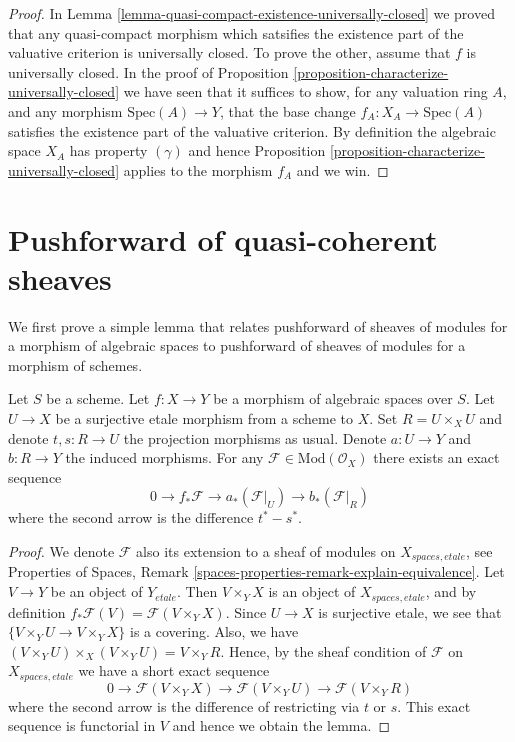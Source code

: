 \begin{proof}
In Lemma \ref{lemma-quasi-compact-existence-universally-closed}
we proved that any quasi-compact morphism which satsifies the existence
part of the valuative criterion is universally closed.
To prove the other, assume that $f$ is universally closed.
In the proof of
Proposition \ref{proposition-characterize-universally-closed}
we have seen that it suffices to show, for any valuation ring $A$,
and any morphism $\text{Spec}(A) \to Y$, that the base change
$f_A : X_A \to \text{Spec}(A)$ satisfies the existence part of the valuative
criterion. By definition the algebraic space $X_A$ has property $(\gamma)$
and hence Proposition \ref{proposition-characterize-universally-closed}
applies to the morphism $f_A$ and we win.
\end{proof}









\section{Pushforward of quasi-coherent sheaves}
\label{section-pushforward}

\noindent
We first prove a simple lemma that relates pushforward of sheaves of modules
for a morphism of algebraic spaces to pushforward of sheaves of modules for
a morphism of schemes.

\begin{lemma}
\label{lemma-compute-pushforward}
Let $S$ be a scheme.
Let $f : X \to Y$ be a morphism of algebraic spaces over $S$.
Let $U \to X$ be a surjective etale morphism from a scheme to $X$.
Set $R = U \times_X U$ and denote $t, s : R \to U$ the projection
morphisms as usual. Denote $a : U \to Y$ and $b : R \to Y$ the induced
morphisms. For any $\mathcal{F} \in \text{Mod}(\mathcal{O}_X)$
there exists an exact sequence
$$
0 \to f_*\mathcal{F} \to a_*(\mathcal{F}|_U) \to b_*(\mathcal{F}|_R)
$$
where the second arrow is the difference $t^* - s^*$.
\end{lemma}

\begin{proof}
We denote $\mathcal{F}$ also its extension to a sheaf of modules on
$X_{spaces, etale}$, see
Properties of Spaces,
Remark \ref{spaces-properties-remark-explain-equivalence}.
Let $V \to Y$ be an object of $Y_{etale}$. Then $V \times_Y X$ is an
object of $X_{spaces, etale}$, and by definition
$f_*\mathcal{F}(V) = \mathcal{F}(V \times_Y X)$. Since $U \to X$ is
surjective etale, we see that $\{V \times_Y U \to V \times_Y X\}$
is a covering. Also, we have
$(V \times_Y U) \times_X (V \times_Y U) = V \times_Y R$.
Hence, by the sheaf condition of $\mathcal{F}$ on
$X_{spaces, etale}$ we have a short exact sequence
$$
0 \to \mathcal{F}(V \times_Y X)
\to \mathcal{F}(V \times_Y U) \to \mathcal{F}(V \times_Y R)
$$
where the second arrow is the difference of restricting via $t$ or $s$.
This exact sequence is functorial in $V$ and hence we obtain the lemma.
\end{proof}

